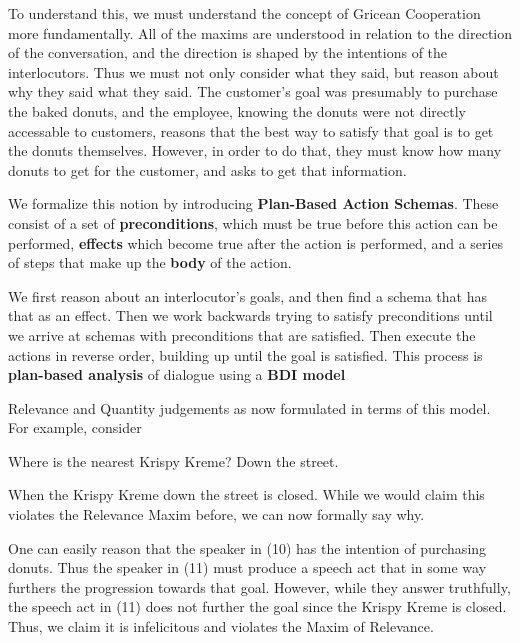 \documentclass[11pt]{article}
\begin{document}
To understand this, we must understand the concept of Gricean Cooperation  more fundamentally. All of the maxims
are understood in relation to the direction of the conversation, and the direction is shaped by the 
intentions of the interlocutors. Thus we must not only consider what they said, but reason about why they said
what they said. The customer's goal was presumably to purchase the baked donuts, and the employee, knowing the 
donuts were not directly accessable to customers, reasons that the best way to satisfy that goal is to get the
donuts themselves. However, in order to do that, they must know how many donuts to get for the customer, and
asks to get that information.

We formalize this notion by introducing \textbf{Plan-Based Action Schemas}. These consist of a set of 
\textbf{preconditions}, which must be true before this action can be performed, \textbf{effects} which
become true after the action is performed, and a series of steps that make up the \textbf{body} of the
action.

We first reason about an interlocutor's goals, and then find a schema that has that as an effect. Then 
we work backwards trying to satisfy preconditions until we arrive at schemas with preconditions that
are satisfied. Then execute the actions in reverse order, building up until the goal is satisfied. This
process is \textbf{plan-based analysis} of dialogue using a \textbf{BDI model}

Relevance and Quantity judgements as now formulated in terms of this model. For example, consider

\begin{exe}
    \ex Where is the nearest Krispy Kreme?
    \ex Down the street.
\end{exe}

When the Krispy Kreme down the street is closed. While we would claim this violates the Relevance Maxim
before, we can now formally say why. 

One can easily reason that the speaker in (10) has the intention of purchasing donuts. Thus the speaker
in (11) must produce a speech act that in some way furthers the progression towards that goal. However,
while they answer truthfully, the speech act in (11) does not further the goal since the Krispy Kreme
is closed. Thus, we claim it is infelicitous and violates the Maxim of Relevance.
\end{document}

